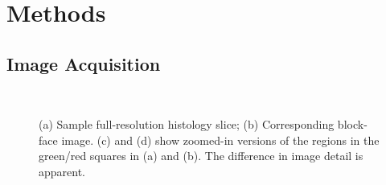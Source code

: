 \section{Methods} %
\label{sec:methods}
  \subsection{Image Acquisition} %
  \label{sub:image_acquisition}
    \begin{figure}[!t]
      \centering
      \\
      \caption{(a) Sample full-resolution histology slice; (b) Corresponding block-face image. (c) and (d) show zoomed-in versions of the regions in the green/red squares in (a) and (b). The difference in image detail is apparent.}
      \label{fig:raw_images}
    \end{figure}
